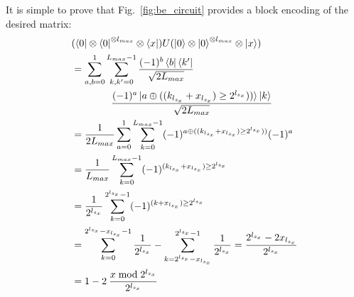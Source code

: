 \documentclass[aps,prx,twocolumn,floatfix,10pt,amssymb,amsfont,amsmath,superscriptaddress,float,nofootinbib,longbibliography,nobalancelastpage]{revtex4-2}
\theoremstyle{empty}
\begin{document}
It is simple to prove that Fig.~\ref{fig:be_circuit} provides a block encoding of the desired matrix:
\begin{align*}
&(\bra{0}\otimes\bra{0}^{\otimes l_{max}}\otimes\bra{x}) U (\ket{0}\otimes\ket{0}^{\otimes l_{max}}\otimes\ket{x}) \\
&= \sum_{a,b=0}^1\sum_{k,k'=0}^{L_{max}-1} \frac{(-1)^b \bra{b}\bra{k'}}{\sqrt{2L_{max}}} \\
& \qquad\qquad \frac{(-1)^{a}\ket{a \oplus ((k_{l_{s_x}}+x_{l_{s_x}})\ge 2^{l_{s_x}}))}\ket{k}}{\sqrt{2L_{max}}}\\
&=  \frac{1}{2L_{max}}\sum_{a=0}^1\sum_{k=0}^{L_{max}-1} (-1)^{a \oplus ((k_{l_{s_x}}+x_{l_{s_x}})\ge 2^{l_{s_x}}))} (-1)^a\\
&= \frac{1}{L_{max}}\sum_{k=0}^{L_{max}-1}  (-1)^{(k_{l_{s_x}}+x_{l_{s_x}})\ge 2^{l_{s_x}}}\\
&= \frac{1}{2^{l_{s_x}}}\sum_{k=0}^{2^{l_{s_x}}-1} (-1)^{(k+x_{l_{s_x}})\ge 2^{l_{s_x}}} \\
&= \sum_{k=0}^{2^{l_{s_x}}-x_{l_{s_x}}-1} \frac{1}{2^{l_{s_x}}}-\sum_{k=2^{l_{s_x}}-x_{l_{s_x}}}^{2^{l_{s_x}}-1} \frac{1}{2^{l_{s_x}}} = \frac{2^{l_{s_x}}-2x_{l_{s_x}}}{2^{l_{s_x}}}\\
&= 1 - 2\>\frac{x \bmod 2^{l_{s_x}}}{2^{l_{s_x}}}
\end{align*}
\end{document}
